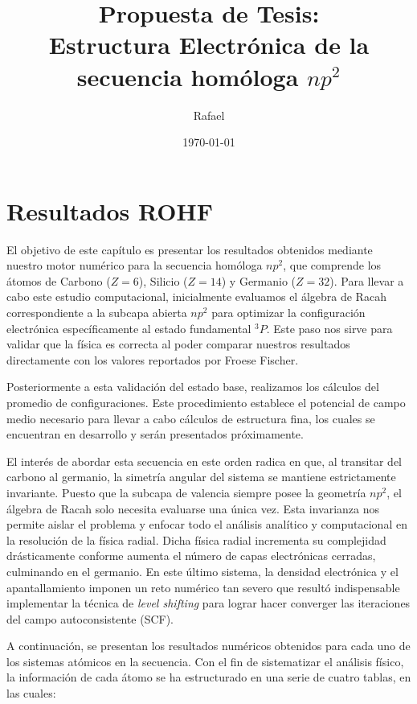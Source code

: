 \documentclass[12pt,a4paper]{book}
\title{\textbf{Propuesta de Tesis:} \\ 
Estructura Electrónica de la secuencia homóloga \( np^2 \)}
\author{Rafael}
\date{\today}
\begin{document}
\frontmatter %
\maketitle
\tableofcontents

\mainmatter %
\chapter{Resultados ROHF}

El objetivo de este capítulo es presentar los resultados obtenidos mediante nuestro motor numérico para la secuencia homóloga $np^{2}$, que comprende los átomos de Carbono ($Z=6$), Silicio ($Z=14$) y Germanio ($Z=32$). Para llevar a cabo este estudio computacional, inicialmente evaluamos el álgebra de Racah correspondiente a la subcapa abierta $np^{2}$ para optimizar la configuración electrónica específicamente al estado fundamental $^{3}P$. Este paso nos sirve para validar que la física es correcta al poder comparar nuestros resultados directamente con los valores reportados por Froese Fischer.

Posteriormente a esta validación del estado base, realizamos los cálculos del promedio de configuraciones. Este procedimiento establece el potencial de campo medio necesario para llevar a cabo cálculos de estructura fina, los cuales se encuentran en desarrollo y serán presentados próximamente.

El interés de abordar esta secuencia en este orden radica en que, al transitar del carbono al germanio, la simetría angular del sistema se mantiene estrictamente invariante. Puesto que la subcapa de valencia siempre posee la geometría $np^{2}$, el álgebra de Racah solo necesita evaluarse una única vez. Esta invarianza nos permite aislar el problema y enfocar todo el análisis analítico y computacional en la resolución de la física radial. Dicha física radial incrementa su complejidad drásticamente conforme aumenta el número de capas electrónicas cerradas, culminando en el germanio. En este último sistema, la densidad electrónica y el apantallamiento imponen un reto numérico tan severo que resultó indispensable implementar la técnica de \textit{level shifting} para lograr hacer converger las iteraciones del campo autoconsistente (SCF).

A continuación, se presentan los resultados numéricos obtenidos para cada uno de los sistemas atómicos en la secuencia. Con el fin de sistematizar el análisis físico, la información de cada átomo se ha estructurado en una serie de cuatro tablas, en las cuales:
\end{document}
